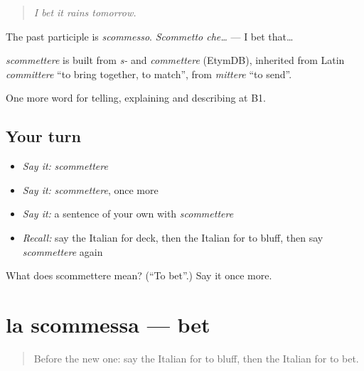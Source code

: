 \begin{quote}
\emph{I bet it rains tomorrow.}
\end{quote}

The past participle is \emph{scommesso}. \emph{Scommetto che…} — I bet that…

\begin{cousinweb}
\emph{scommettere} is built from \emph{s-} and \emph{commettere} (EtymDB), inherited from Latin \emph{committere} \textquotedblleft{}to bring together, to match\textquotedblright{}, from \emph{mittere} \textquotedblleft{}to send\textquotedblright{}.
\end{cousinweb}

\begin{grammarlens}[title={What you've built}]
One more word for telling, explaining and describing at B1.
\end{grammarlens}

\subsection*{Your turn}
\begin{itemize}
\raggedright
  \item \emph{Say it:} \emph{scommettere}
  \item \emph{Say it:} \emph{scommettere}, once more
  \item \emph{Say it:} a sentence of your own with \emph{scommettere}
  \item \emph{Recall:} say the Italian for deck, then the Italian for to bluff, then say \emph{scommettere} again
\end{itemize}

\begin{tcolorbox}[breakable,colback=teal!4,colframe=teal!35!black,title={Before you move on}]
What does scommettere mean? (\textquotedblleft{}To bet\textquotedblright{}.) Say it once more.
\end{tcolorbox}
\section[la scommessa]{la scommessa — bet}

\label{lesson:IT-C504-scommessa}



\begin{quote}
Before the new one: say the Italian for to bluff, then the Italian for to bet.
\end{quote}

